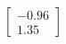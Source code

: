 \documentclass[preview]{standalone}
\begin{document}
\begin{align*}
\begin{bmatrix} -0.96 \\ 1.35 \end{bmatrix}
\end{align*}
\end{document}
